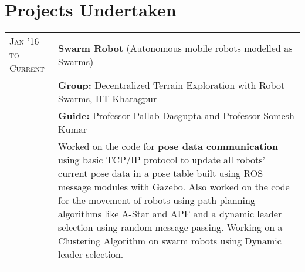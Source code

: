 \documentclass[a4paper,11pt]{extarticle} %
\begin{document}
\section{Projects Undertaken}

\begin{tabular}{R{3.0cm}|p{15.0cm}}
\textsc{Jan '16 to Current} & \textbf{Swarm Robot} \textmd{(Autonomous mobile robots modelled as Swarms)} \\
 & \textbf{Group: }\textmd{Decentralized Terrain Exploration with Robot Swarms}, IIT Kharagpur\\
& \textbf{Guide: }\textmd{Professor Pallab Dasgupta} and \textmd{Professor Somesh Kumar}\\
& \textmd{Worked on the code for \textbf{pose data communication} using basic TCP/IP protocol to update all robots' current pose data in a pose table built using ROS message modules with Gazebo. Also worked on the code for the movement of robots using path-planning algorithms like A-Star and APF and a dynamic leader selection using random message passing. Working on a Clustering Algorithm on swarm robots using Dynamic leader selection.}\\
 \\




\end{tabular}
\end{document}
